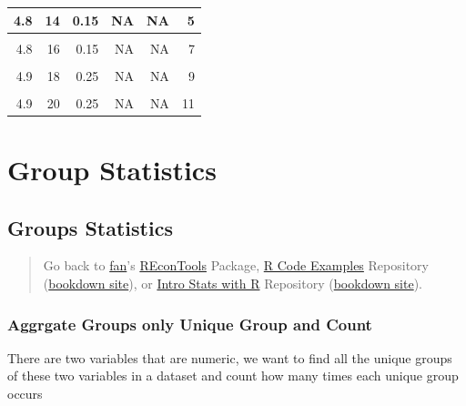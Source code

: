 \documentclass[
]{book}
\begin{document}
\begin{table}[!h]
{\begin{tabular}{r|r|r|r|r|r}
\hline
4.8 & 14 & 0.15 & NA & NA & 5\\
\hline
\cellcolor{gray!6}{4.8} & \cellcolor{gray!6}{15} & \cellcolor{gray!6}{0.15} & \cellcolor{gray!6}{NA} & \cellcolor{gray!6}{NA} & \cellcolor{gray!6}{6}\\
\hline
4.8 & 16 & 0.15 & NA & NA & 7\\
\hline
\cellcolor{gray!6}{4.9} & \cellcolor{gray!6}{17} & \cellcolor{gray!6}{0.25} & \cellcolor{gray!6}{NA} & \cellcolor{gray!6}{NA} & \cellcolor{gray!6}{8}\\
\hline
4.9 & 18 & 0.25 & NA & NA & 9\\
\hline
\cellcolor{gray!6}{4.9} & \cellcolor{gray!6}{19} & \cellcolor{gray!6}{0.25} & \cellcolor{gray!6}{NA} & \cellcolor{gray!6}{NA} & \cellcolor{gray!6}{10}\\
\hline
4.9 & 20 & 0.25 & NA & NA & 11\\
\hline
\end{tabular}}
\end{table}

\hypertarget{group-statistics}{%
\section{Group Statistics}\label{group-statistics}}

\hypertarget{groups-statistics}{%
\subsection{Groups Statistics}\label{groups-statistics}}

\begin{quote}
Go back to \href{http://fanwangecon.github.io/}{fan}'s \href{https://fanwangecon.github.io/REconTools/}{REconTools} Package, \href{https://fanwangecon.github.io/R4Econ/}{R Code Examples} Repository (\href{https://fanwangecon.github.io/R4Econ/bookdown}{bookdown site}), or \href{https://fanwangecon.github.io/Stat4Econ/}{Intro Stats with R} Repository (\href{https://fanwangecon.github.io/Stat4Econ/bookdown}{bookdown site}).
\end{quote}

\hypertarget{aggrgate-groups-only-unique-group-and-count}{%
\subsubsection{Aggrgate Groups only Unique Group and Count}\label{aggrgate-groups-only-unique-group-and-count}}

There are two variables that are numeric, we want to find all the unique groups of these two variables in a dataset and count how many times each unique group occurs
\end{document}

